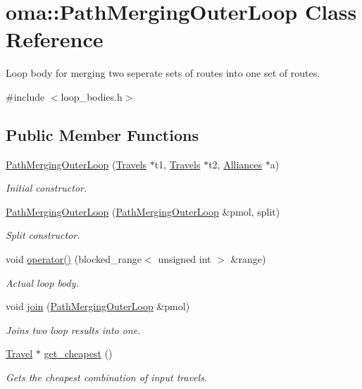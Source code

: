 \hypertarget{classoma_1_1_path_merging_outer_loop}{\section{oma\-:\-:Path\-Merging\-Outer\-Loop Class Reference}
\label{classoma_1_1_path_merging_outer_loop}
}


Loop body for merging two seperate sets of routes into one set of routes.  




{\ttfamily \#include $<$loop\-\_\-bodies.\-h$>$}

\subsection*{Public Member Functions}
\begin{DoxyCompactItemize}
\item 
\hyperlink{classoma_1_1_path_merging_outer_loop_a902977792ce796e3d2ff0d23585bfde5}{Path\-Merging\-Outer\-Loop} (\hyperlink{types_8h_aef021ba284c03a12dddcfa082468e831}{Travels} $\ast$t1, \hyperlink{types_8h_aef021ba284c03a12dddcfa082468e831}{Travels} $\ast$t2, \hyperlink{types_8h_a942cbcc40778424afe78605ae5c364c0}{Alliances} $\ast$a)
\begin{DoxyCompactList}\small\item\em Initial constructor. \end{DoxyCompactList}\item 
\hyperlink{classoma_1_1_path_merging_outer_loop_ace1aba6601d4d53fdfbee6e6ecb0ac9e}{Path\-Merging\-Outer\-Loop} (\hyperlink{classoma_1_1_path_merging_outer_loop}{Path\-Merging\-Outer\-Loop} \&pmol, split)
\begin{DoxyCompactList}\small\item\em Split constructor. \end{DoxyCompactList}\item 
void \hyperlink{classoma_1_1_path_merging_outer_loop_af41cf93fb7c74884ab95292258f3df24}{operator()} (blocked\-\_\-range$<$ unsigned int $>$ \&range)
\begin{DoxyCompactList}\small\item\em Actual loop body. \end{DoxyCompactList}\item 
void \hyperlink{classoma_1_1_path_merging_outer_loop_aeeccf0ae7755d57c02d4c5b443331ada}{join} (\hyperlink{classoma_1_1_path_merging_outer_loop}{Path\-Merging\-Outer\-Loop} \&pmol)
\begin{DoxyCompactList}\small\item\em Joins two loop results into one. \end{DoxyCompactList}\item 
\hyperlink{class_travel}{Travel} $\ast$ \hyperlink{classoma_1_1_path_merging_outer_loop_a4186ce8bbac37b759b77b8c457cd2fac}{get\-\_\-cheapest} ()
\begin{DoxyCompactList}\small\item\em Gets the cheapest combination of input travels. \end{DoxyCompactList}\end{DoxyCompactItemize}
